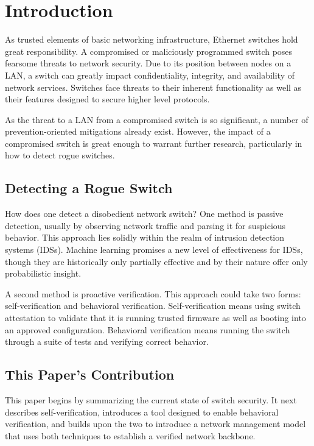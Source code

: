 \documentclass[journal]{IEEEtran}
\begin{document}
\section{Introduction}

As trusted elements of basic networking infrastructure, Ethernet switches hold great
responsibility. A compromised or maliciously programmed switch poses fearsome threats to network
security. Due to its position between nodes on a LAN, a switch can greatly impact confidentiality,
integrity, and availability of network services. Switches face threats to their inherent
functionality as well as their features designed to secure higher level protocols.

As the threat to a LAN from a compromised switch is so significant, a number of prevention-oriented
mitigations already exist. However, the impact of a compromised switch is great enough to warrant
further research, particularly in how to detect rogue switches.

\subsection{Detecting a Rogue Switch}
How does one detect a disobedient network switch? One method is passive detection, usually by
observing network traffic and parsing it for suspicious behavior. This approach lies solidly within
the realm of intrusion detection systems (IDSs). Machine learning promises a new level of
effectiveness for IDSs, though they are historically only partially effective and by their nature
offer only probabilistic insight.

A second method is proactive verification. This approach could take two forms: self-verification
and behavioral verification. Self-verification means using switch attestation to validate that it
is running trusted firmware as well as booting into an approved configuration. Behavioral
verification means running the switch through a suite of tests and verifying correct behavior.

\subsection{This Paper's Contribution}
This paper begins by summarizing the current state of switch security. It next describes
self-verification, introduces a tool designed to enable behavioral verification, and builds upon the
two to introduce a network management model that uses both techniques to establish a verified
network backbone.
\end{document}

